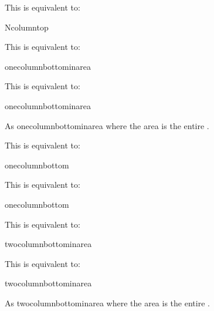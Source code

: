 \documentclass[fontsize=12pt]{scrbook}
\begin{document}
This is equivalent to: 
\begin{compactcodebox}
\gls{Ncolumntop}
\end{compactcodebox}

This is equivalent to: 
\begin{compactcodebox}
\gls{onecolumnbottominarea}
\end{compactcodebox}

This is equivalent to: 
\begin{compactcodebox}
\gls{onecolumnbottominarea}
\end{compactcodebox}

As \gls{onecolumnbottominarea} where the area is the entire .

This is equivalent to: 
\begin{compactcodebox}
\gls{onecolumnbottom}
\end{compactcodebox}

This is equivalent to: 
\begin{compactcodebox}
\gls{onecolumnbottom}
\end{compactcodebox}

This is equivalent to: 
\begin{compactcodebox}
\gls{twocolumnbottominarea}
\end{compactcodebox}

This is equivalent to: 
\begin{compactcodebox}
\gls{twocolumnbottominarea}
\end{compactcodebox}

As \gls{twocolumnbottominarea} where the area is the entire .
\end{document}
